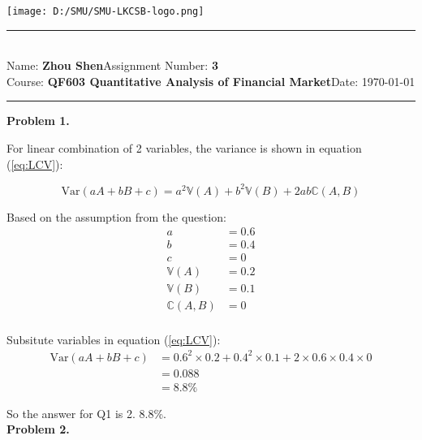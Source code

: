 \documentclass[12pt,a4paper]{article}
\newcommand{\student}{\textbf{Zhou Shen}}
\newcommand{\course}{\textbf{QF603 Quantitative Analysis of Financial Market}}
\newcommand{\assignment}{\textbf{3}}
\begin{document}
\thispagestyle{empty}
\begin{center}
	\texttt{[image: D:/SMU/SMU-LKCSB-logo.png]}
	\vspace{0.5cm}
\end{center}
\noindent
\rule{17cm}{0.2cm}\\[0.3cm]
Name: \student \hfill Assignment Number: \assignment\\[0.1cm]
Course: \course \hfill Date: \today\\
\rule{17cm}{0.05cm}
\vspace{1.0cm}

\textbf{Problem 1.}

For linear combination of 2 variables, the variance is shown in equation (\ref{eq:LCV}):

\begin{equation}\label{eq:LCV}
    \mathrm{Var}(aA+bB+c) = a^2\mathbb{V}(A) + b^2\mathbb{V}(B) + 2ab\mathbb{C}(A,B)
\end{equation}
    
Based on the assumption from the question:
\[
\begin{aligned}
    a &= 0.6\\
    b &= 0.4\\
    c &= 0 \\
    \mathbb{V}(A) & = 0.2\\
    \mathbb{V}(B) & = 0.1\\
    \mathbb{C}(A,B) & = 0\\
\end{aligned}    
\]

Subsitute variables in equation (\ref{eq:LCV}):
\[
\begin{aligned}
    \mathrm{Var}(aA+bB+c) &= 0.6^2 \times 0.2 + 0.4^2 \times 0.1 + 2 \times 0.6 \times 0.4 \times 0\\
    &= 0.088\\
    &= 8.8 \%
\end{aligned}
\]

So the answer for Q1 is 2. 8.8\%.
\\

\textbf{Problem 2.}
\end{document}
